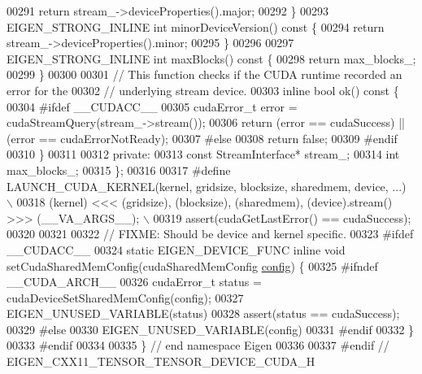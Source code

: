\begin{DoxyCode}
00291     \textcolor{keywordflow}{return} stream\_->deviceProperties().major;
00292   \}
00293   EIGEN\_STRONG\_INLINE \textcolor{keywordtype}{int} minorDeviceVersion()\textcolor{keyword}{ const }\{
00294     \textcolor{keywordflow}{return} stream\_->deviceProperties().minor;
00295   \}
00296 
00297   EIGEN\_STRONG\_INLINE \textcolor{keywordtype}{int} maxBlocks()\textcolor{keyword}{ const }\{
00298     \textcolor{keywordflow}{return} max\_blocks\_;
00299   \}
00300 
00301   \textcolor{comment}{// This function checks if the CUDA runtime recorded an error for the}
00302   \textcolor{comment}{// underlying stream device.}
00303   \textcolor{keyword}{inline} \textcolor{keywordtype}{bool} ok()\textcolor{keyword}{ const }\{
00304 \textcolor{preprocessor}{#ifdef \_\_CUDACC\_\_}
00305     cudaError\_t error = cudaStreamQuery(stream\_->stream());
00306     \textcolor{keywordflow}{return} (error == cudaSuccess) || (error == cudaErrorNotReady);
00307 \textcolor{preprocessor}{#else}
00308     \textcolor{keywordflow}{return} \textcolor{keyword}{false};
00309 \textcolor{preprocessor}{#endif}
00310   \}
00311 
00312  \textcolor{keyword}{private}:
00313   \textcolor{keyword}{const} StreamInterface* stream\_;
00314   \textcolor{keywordtype}{int} max\_blocks\_;
00315 \};
00316 
00317 \textcolor{preprocessor}{#define LAUNCH\_CUDA\_KERNEL(kernel, gridsize, blocksize, sharedmem, device, ...)             \(\backslash\)}
00318 \textcolor{preprocessor}{  (kernel) <<< (gridsize), (blocksize), (sharedmem), (device).stream() >>> (\_\_VA\_ARGS\_\_);   \(\backslash\)}
00319 \textcolor{preprocessor}{  assert(cudaGetLastError() == cudaSuccess);}
00320 
00321 
00322 \textcolor{comment}{// FIXME: Should be device and kernel specific.}
00323 \textcolor{preprocessor}{#ifdef \_\_CUDACC\_\_}
00324 \textcolor{keyword}{static} EIGEN\_DEVICE\_FUNC \textcolor{keyword}{inline} \textcolor{keywordtype}{void} setCudaSharedMemConfig(cudaSharedMemConfig 
      \hyperlink{structconfig__s}{config}) \{
00325 \textcolor{preprocessor}{#ifndef \_\_CUDA\_ARCH\_\_}
00326   cudaError\_t status = cudaDeviceSetSharedMemConfig(config);
00327   EIGEN\_UNUSED\_VARIABLE(status)
00328   assert(status == cudaSuccess);
00329 \textcolor{preprocessor}{#else}
00330   EIGEN\_UNUSED\_VARIABLE(config)
00331 \textcolor{preprocessor}{#endif}
00332 \}
00333 \textcolor{preprocessor}{#endif}
00334 
00335 \}  \textcolor{comment}{// end namespace Eigen}
00336 
00337 \textcolor{preprocessor}{#endif  // EIGEN\_CXX11\_TENSOR\_TENSOR\_DEVICE\_CUDA\_H}
\end{DoxyCode}
